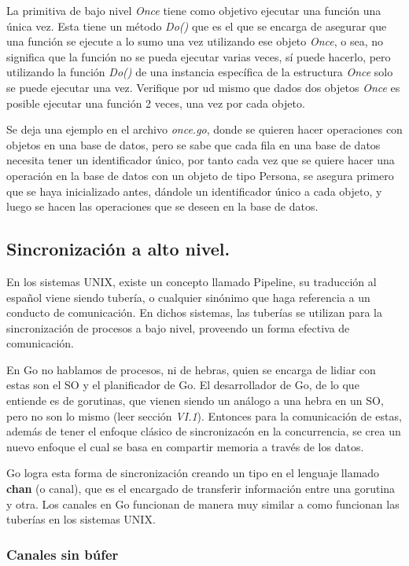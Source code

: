 \documentclass[10pt]{article} %
\begin{document}
La primitiva de bajo nivel \emph{Once} tiene como objetivo ejecutar una función una única vez. Esta tiene un método \emph{Do()} que es el que se encarga de asegurar que una función se ejecute a lo sumo una vez utilizando ese objeto \emph{Once}, o sea, no significa que la función no se pueda ejecutar varias veces, sí puede hacerlo, pero utilizando la función \emph{Do()} de una instancia específica de la estructura \emph{Once} solo se puede ejecutar una vez. Verifique por ud mismo que dados dos objetos \emph{Once} es posible ejecutar una función 2 veces, una vez por cada objeto.

Se deja una ejemplo en el archivo \textit{once.go}, donde se quieren hacer operaciones con objetos en una base de datos, pero se sabe que cada fila en una base de datos necesita tener un identificador único, por tanto cada vez que se quiere hacer una operación en la base de datos con un objeto de tipo Persona, se asegura primero que se haya inicializado antes, dándole un identificador único a cada objeto, y luego se hacen las operaciones que se deseen en la base de datos.

\subsection{Sincronización a alto nivel.}

En los sistemas UNIX, existe un concepto llamado Pipeline, su traducción al español viene siendo tubería, o cualquier sinónimo que haga referencia a un conducto de comunicación. En dichos sistemas, las tuberías se utilizan para la sincronización de procesos a bajo nivel, proveendo un forma efectiva de comunicación.

En Go no hablamos de procesos, ni de hebras, quien se encarga de lidiar con estas son el SO y el planificador de Go. El desarrollador de Go, de lo que entiende es de gorutinas, que vienen siendo un análogo a una hebra en un SO, pero no son lo mismo (leer sección \emph{VI.1}). Entonces para la comunicación de estas, además de tener el enfoque clásico de sincronizacón en la concurrencia, se crea un nuevo enfoque el cual se basa en compartir memoria a través de los datos. 

Go logra esta forma de sincronización creando un tipo en el lenguaje llamado \textbf{chan} (o canal), que es el encargado de transferir información entre una gorutina y otra. Los canales en Go funcionan de manera muy similar a como funcionan las tuberías en los sistemas UNIX. 

\subsubsection{Canales sin búfer}
\end{document}
